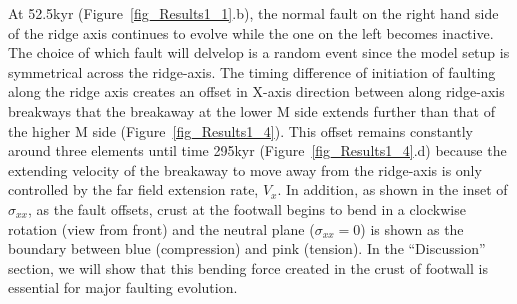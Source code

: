 At 52.5kyr (Figure~\ref{fig_Results1_1}.b), the normal fault on the right hand side of the ridge axis continues to evolve while the one on the left becomes inactive. The choice of which fault will delvelop is a random event since the model setup is symmetrical across the ridge-axis. The timing difference of initiation of faulting along the ridge axis creates an offset in X-axis direction between along ridge-axis breakways that the breakaway at the lower M side extends further than that of the higher M side (Figure~\ref{fig_Results1_4}). This offset remains constantly around three elements until time 295kyr (Figure~\ref{fig_Results1_4}.d) because the extending velocity of the breakaway to move away from the ridge-axis is only controlled by the far field extension rate, $V_{x}$.  In addition, as shown in the inset of $\sigma_{xx}$, as the fault offsets, crust at the footwall begins to bend in a clockwise rotation (view from front) and the neutral plane ($\sigma_{xx}=0$) is shown as the boundary between blue (compression) and pink (tension). In the ``Discussion'' section, we will show that this bending force created in the crust of footwall is essential for major faulting evolution.


